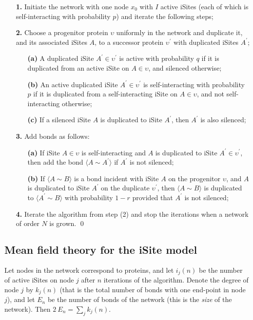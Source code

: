 \documentclass[12pt]{iopart}
\def\edge#1#2{{\langle #1{\sim}#2 \rangle}}
\def\thin{\:\!}
\begin{document}
\vspace{1mm}
\begin{enumerate}
\item[\bf 1.] Initiate the network with one node $x_0$ with $I$ active iSites (each of which is
self-interacting with probability $p$) and iterate the following steps;
\item[\bf 2.] Choose a progenitor protein $\upsilon$ uniformly in the network and duplicate it, and its
associated iSites $A$, to a successor protein $\upsilon^\prime$ with duplicated iSites $A^\prime$;
\begin{itemize}
\item[\bf (a)] A duplicated iSite $A^\prime\in\upsilon^\prime$ is active with probability $q$
if it is duplicated from an active iSite on $A\in\upsilon$, and silenced otherwise;
\item[\bf (b)] An active duplicated iSite $A^\prime\in\upsilon^\prime$ is self-interacting with probability
$p$ if it is duplicated from a self-interacting iSite on $A\in\upsilon$, and not self-interacting
otherwise;
\item[\bf (c)] If a silenced iSite $A$ is duplicated to iSite $A^\prime$, then $A^\prime$ is also silenced;
\end{itemize}
\item[\bf 3.] Add bonds as follows:
\begin{itemize}
\item[\bf (a)] If iSite $A\in\upsilon$ is self-interacting and $A$ is duplicated to iSite 
$A^\prime\in\upsilon^\prime$, then add the bond $\edge{A}{A^\prime}$ 
if $A^\prime$ is not silenced;
\item[\bf (b)] If $\edge{A}{B}$ is a bond incident with iSite $A$ on the progenitor $\upsilon$, and
$A$ is duplicated to iSite $A^\prime$ on the duplicate $\upsilon^\prime$, then
$\edge{A}{B}$ is duplicated to $\edge{A^\prime}{B}$ with probability $1-r$ 
provided that $A^\prime$ is not silenced;
\end{itemize}
\item[\bf 4.] Iterate the algorithm from step (2) and stop the iterations when a network of order $N$ is grown.
\qed
\end{enumerate}
\vspace{5mm}

\subsection{Mean field theory for the iSite model}
Let nodes in the network correspond to proteins, and let $i_j(n)$ be the number of active
iSites on node $j$ after $n$ iterations of the algorithm.  Denote the degree of node $j$ 
by $k_j(n)$ (that is the total number of bonds with one end-point in node $j$),
and let $E_n$ be the number of bonds of the network (this is the \textit{size} of
the network).  Then $2\thin E_n = \sum_j k_j(n)$.
\end{document}
